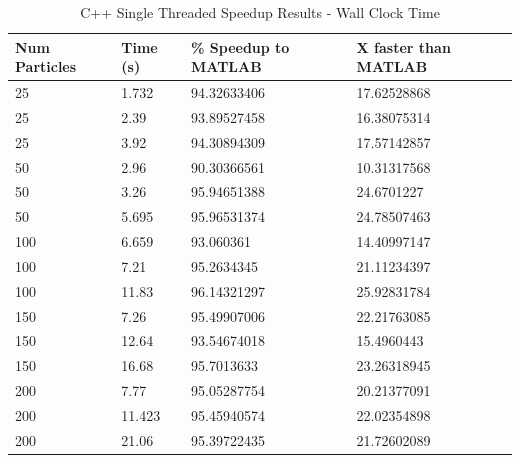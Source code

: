 \begin{table}[H]
    \centering
    \begin{tabular}{@{}llll@{}}
    \toprule
    \textbf{Num Particles} & \textbf{Time (s)} & \textbf{\% Speedup to MATLAB} & \textbf{X faster than MATLAB} \\ \midrule
    25            & 1.732    & 94.32633406          & 17.62528868              \\
    25            & 2.39     & 93.89527458          & 16.38075314              \\
    25            & 3.92     & 94.30894309          & 17.57142857              \\
    50            & 2.96     & 90.30366561          & 10.31317568              \\
    50            & 3.26     & 95.94651388          & 24.6701227               \\
    50            & 5.695    & 95.96531374          & 24.78507463              \\
    100           & 6.659    & 93.060361            & 14.40997147              \\
    100           & 7.21     & 95.2634345           & 21.11234397              \\
    100           & 11.83    & 96.14321297          & 25.92831784              \\
    150           & 7.26     & 95.49907006          & 22.21763085              \\
    150           & 12.64    & 93.54674018          & 15.4960443               \\
    150           & 16.68    & 95.7013633           & 23.26318945              \\
    200           & 7.77     & 95.05287754          & 20.21377091              \\
    200           & 11.423   & 95.45940574          & 22.02354898              \\
    200           & 21.06    & 95.39722435          & 21.72602089              \\ \bottomrule
    \end{tabular}
    \caption{C++ Single Threaded Speedup Results - Wall Clock Time}
    \label{tab:ST-speedup}
    \end{table}


